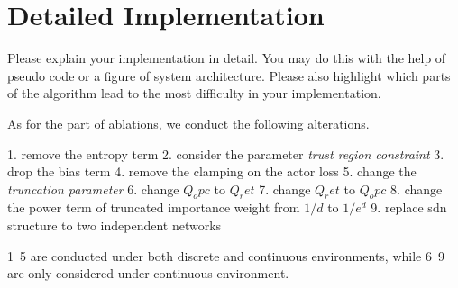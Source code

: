 \section{Detailed Implementation}
\label{section:implementation}
Please explain your implementation in detail. You may do this with the help of pseudo code or a figure of system architecture. Please also highlight which parts of the algorithm lead to the most difficulty in your implementation.


As for the part of ablations, we conduct the following alterations. 

1. remove the entropy term
2. consider the parameter \emph{trust region constraint}
3. drop the bias term 
4. remove the clamping on the actor loss
5. change the \emph{truncation parameter}
6. change $Q_opc$ to $Q_ret$ 
7. change $Q_ret$ to $Q_opc$
8. change the power term of truncated importance weight from $1/d$ to $1 / e^d$
9. replace sdn structure to two independent networks

1~5 are conducted under both discrete and continuous environments, while 6~9 are only considered under continuous environment.

